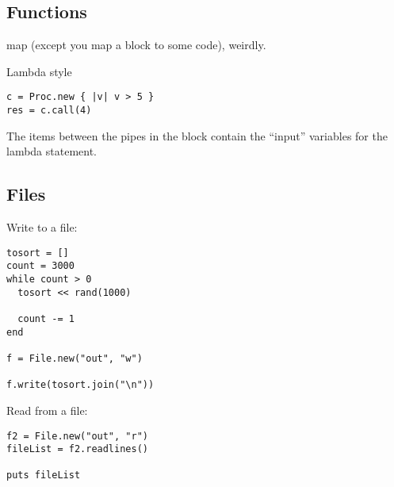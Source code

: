 \documentclass[10pt,twoside,a4paper]{article}
\begin{document}
\subsection{Functions}

map (except you map a block to some code), weirdly.

Lambda style
\begin{verbatim}
c = Proc.new { |v| v > 5 }
res = c.call(4)
\end{verbatim}

The items between the pipes in the block contain the ``input'' variables for the lambda statement.

\subsection{Files}

Write to a file:

\begin{verbatim}
tosort = []
count = 3000
while count > 0
  tosort << rand(1000)

  count -= 1
end

f = File.new("out", "w")

f.write(tosort.join("\n"))
\end{verbatim}

Read from a file:

\begin{verbatim}
f2 = File.new("out", "r")
fileList = f2.readlines()

puts fileList
\end{verbatim}
\end{document}
